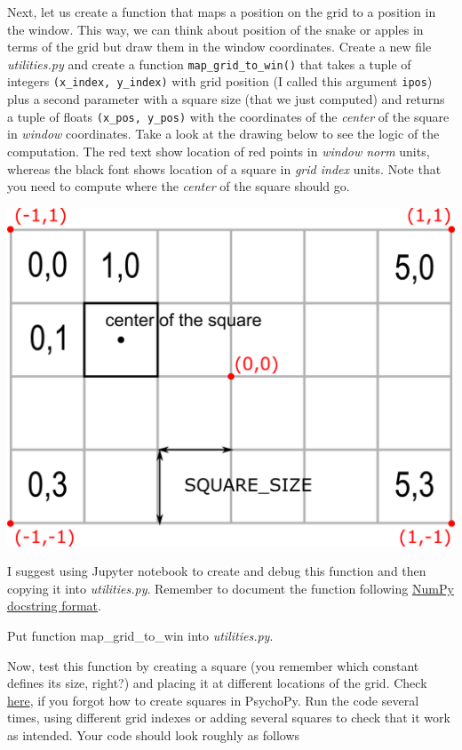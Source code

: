 \documentclass[
]{book}
\begin{document}
Next, let us create a function that maps a position on the grid to a position in the window. This way, we can think about position of the snake or apples in terms of the grid but draw them in the window coordinates. Create a new file \emph{utilities.py} and create a function \texttt{map\_grid\_to\_win()} that takes a tuple of integers \texttt{(x\_index,\ y\_index)} with grid position (I called this argument \texttt{ipos}) plus a second parameter with a square size (that we just computed) and returns a tuple of floats \texttt{(x\_pos,\ y\_pos)} with the coordinates of the \emph{center} of the square in \emph{window} coordinates. Take a look at the drawing below to see the logic of the computation. The red text show location of red points in \emph{window norm} units, whereas the black font shows location of a square in \emph{grid index} units. Note that you need to compute where the \emph{center} of the square should go.

\includegraphics[width=14.74in]{images/snake-grid}

I suggest using Jupyter notebook to create and debug this function and then copying it into \emph{utilities.py}. Remember to document the function following \href{https://numpydoc.readthedocs.io/en/latest/format.html}{NumPy docstring format}.

Put function map\_grid\_to\_win into \emph{utilities.py}.

Now, test this function by creating a square (you remember which constant defines its size, right?) and placing it at different locations of the grid. Check \protect\hyperlink{seminar08-add-square}{here}, if you forgot how to create squares in PsychoPy. Run the code several times, using different grid indexes or adding several squares to check that it work as intended. Your code should look roughly as follows
\end{document}
